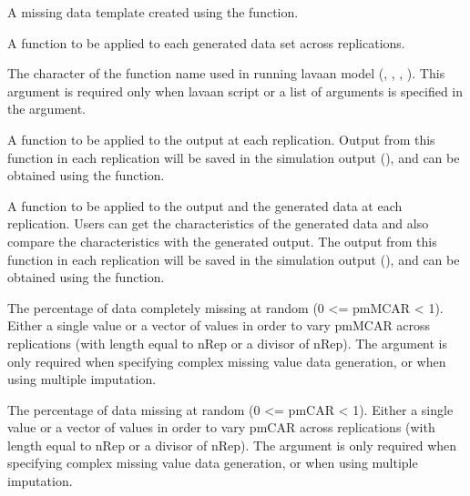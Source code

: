 \documentclass[a4paper]{book}
\begin{document}
\begin{Arguments}
\begin{ldescription}
\item[\code{miss}] 
A missing data template created using the  function.

\item[\code{datafun}] 
A function to be applied to each generated data set across replications.

\item[\code{lavaanfun}] 
The character of the function name used in running lavaan model (, , , ). This argument is required only when lavaan script or a list of arguments is specified in the  argument.

\item[\code{outfun}] 
A function to be applied to the  output at each replication. Output from this function in each replication will be saved in the simulation output (), and can be obtained using the  function.

\item[\code{outfundata}] 
A function to be applied to the  output and the generated data at each replication. Users can get the characteristics of the generated data and also compare the characteristics with the generated output. The output from this function in each replication will be saved in the simulation output (), and can be obtained using the  function.

\item[\code{pmMCAR}] 
The percentage of data completely missing at random (0 <= pmMCAR < 1). Either a single value or a vector of values in order to vary pmMCAR across replications (with length equal to nRep or a divisor of nRep). The  argument is only required when specifying complex missing value data generation, or when using multiple imputation. 

\item[\code{pmMAR}] 
The percentage of data missing at random (0 <= pmCAR < 1). Either a single value or a vector of values in order to vary pmCAR across replications (with length equal to nRep or a divisor of nRep). The  argument is only required when specifying complex missing value data generation, or when using multiple imputation. 



\end{ldescription}
\end{Arguments}
\end{document}
